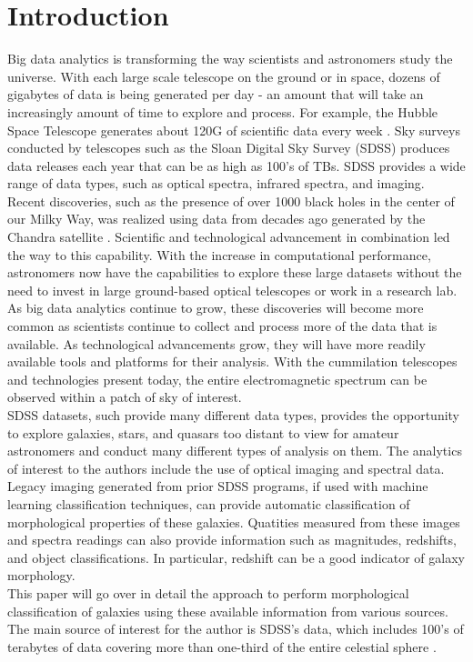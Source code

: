 \documentclass[11pt,sigconf]{acmart}
\begin{document}
\section{Introduction}

Big data analytics is transforming the way scientists and astronomers study the universe. 
With each large scale telescope on the ground or in space, dozens of gigabytes of data 
is being generated per day - an amount that will take an increasingly amount of time
to explore and process. For example, the Hubble Space Telescope generates about 120G of 
scientific data every week \cite{tillman}. Sky surveys conducted by telescopes such as
the Sloan Digital Sky Survey (SDSS) produces data releases each year that can be as high as
100's of TBs. SDSS provides a wide range of data types, such as optical spectra,
infrared spectra, and imaging. 
\\
Recent discoveries, such as the presence of over 1000 black holes 
in the center of our Milky Way, was realized using data from decades ago generated by
the Chandra satellite \cite{sagittarius}. Scientific and technological advancement in 
combination led the 
way to this capability. With the increase in computational performance, astronomers 
now have the capabilities to explore these large datasets without the need to invest 
in large ground-based optical telescopes or work in a research lab. 
As big data analytics continue to grow, these discoveries will become more common as 
scientists continue to collect and process more of the data that is available. As technological
advancements grow, they will have more readily available tools and platforms for their 
analysis. With the cummilation telescopes and technologies present today, the entire 
electromagnetic spectrum can be observed within a patch of sky of interest. 
\\
SDSS datasets, such provide many different data types, provides the opportunity to
explore galaxies, stars, and quasars too distant to view for amateur astronomers and 
conduct many different types of analysis on them. The analytics of interest to the
authors include the use of optical imaging and spectral data. Legacy imaging generated 
from prior SDSS programs, if used with machine learning classification techniques, 
can provide automatic classification of morphological properties of these galaxies. 
Quatities measured from these images and spectra readings can also provide information
such as magnitudes, redshifts, and object classifications. In particular, redshift can
be a good indicator of galaxy morphology. 
\\
This paper will go over in detail the approach to perform morphological classification of 
galaxies using these available information from various sources. The main source of interest
for the author is SDSS's data, which includes 100's of terabytes of data covering more
than one-third of the entire celestial sphere \cite{abdurro}.
\end{document}
